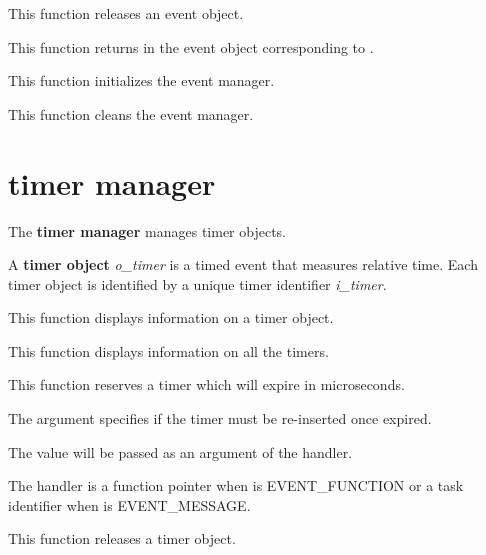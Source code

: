 	 {
	   This function releases an event object.
	 }

	 {
	   This function returns in  the event object
	   corresponding to .
	 }

	 {
	   This function initializes the event manager.
	 }

	 {
	   This function cleans the event manager.
	 }

%
%

\section{timer manager}

The \textbf{timer manager} manages timer objects.

A \textbf{timer object} \textit{o\_timer} is a timed event that measures
relative time. Each timer object is identified by a unique timer identifier
\textit{i\_timer}.

%
%

	 {
	   This function displays information on a timer object.
	 }

	 {
	   This function displays information on all the timers.
	 }

	 {
	   This function reserves a timer which will expire in
	    microseconds.

	   The  argument specifies if the timer
	   must be re-inserted once expired. %

	   The  value will be passed as an argument
	   of the handler.

	   The handler  is a function pointer when
	    is EVENT\_FUNCTION or a task identifier when
	    is EVENT\_MESSAGE.
	 }

	 {
	   This function releases a timer object.
	 }


